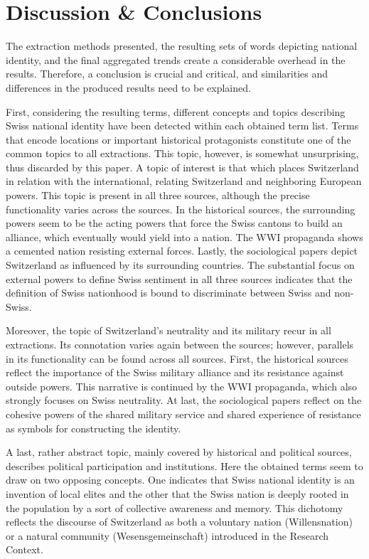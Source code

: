 \documentclass[11pt]{article}
\begin{document}
\section{Discussion \& Conclusions}
The extraction methods presented, the resulting sets of words depicting national identity, and the final aggregated trends create a considerable overhead in the results. Therefore, a conclusion is crucial and critical, and similarities and differences in the produced results need to be explained.\par
First, considering the resulting terms, different concepts and topics describing Swiss national identity have been detected within each obtained term list. Terms that encode locations or important historical protagonists constitute one of the common topics to all extractions. This topic, however, is somewhat unsurprising, thus discarded by this paper. A topic of interest is that which places Switzerland in relation with the international, relating Switzerland and neighboring European powers. This topic is present in all three sources, although the precise functionality varies across the sources. In the historical sources, the surrounding powers seem to be the acting powers that force the Swiss cantons to build an alliance, which eventually would yield into a nation. The WWI propaganda shows a cemented nation resisting external forces. Lastly, the sociological papers depict Switzerland as influenced by its surrounding countries. The substantial focus on external powers to define Swiss sentiment in all three sources indicates that the definition of Swiss nationhood is bound to discriminate between Swiss and non-Swiss.  \par
Moreover, the topic of Switzerland's neutrality and its military recur in all extractions. Its connotation varies again between the sources; however, parallels in its functionality can be found across all sources. First, the historical sources reflect the importance of the Swiss military alliance and its resistance against outside powers. This narrative is continued by the WWI propaganda, which also strongly focuses on Swiss neutrality. At last, the sociological papers reflect on the cohesive powers of the shared military service and shared experience of resistance as symbols for constructing the identity.\par
A last, rather abstract topic, mainly covered by historical and political sources, describes political participation and institutions. Here the obtained terms seem to draw on two opposing concepts. One indicates that Swiss national identity is an invention of local elites and the other that the Swiss nation is deeply rooted in the population by a sort of collective awareness and memory. This dichotomy reflects the discourse of Switzerland as both a voluntary nation (Willensnation) or a natural community (Wesensgemeinschaft) \citep{zimmer1999forging} introduced in the Research Context.\par
\end{document}
